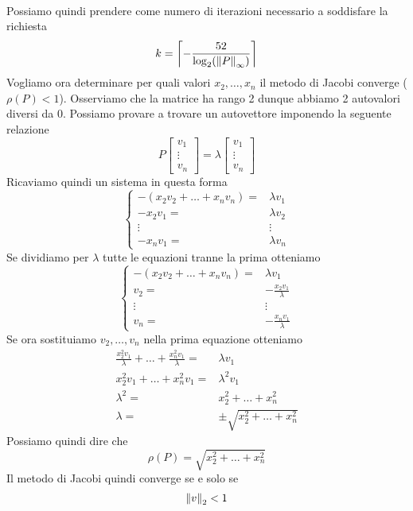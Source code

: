 \begin{example}
\begin{align*}
	\end{align*}
	Possiamo quindi prendere come numero di iterazioni necessario a soddisfare la richiesta
	\[ k = \left\lceil -\frac{52}{\log_2 (\left\lVert P\right\rVert_\infty)} \right\rceil \]
	Vogliamo ora determinare per quali valori $x_2, \dots, x_n$ il metodo di Jacobi converge ($\rho (P) < 1$).
	Osserviamo che la matrice ha rango 2 dunque abbiamo 2 autovalori diversi da 0. Possiamo provare a trovare un
	autovettore imponendo la seguente relazione
	\[
		P \begin{bmatrix} v_1 \\ \vdots \\ v_n \end{bmatrix} =
		\lambda \begin{bmatrix} v_1 \\ \vdots \\ v_n \end{bmatrix}
	\]
	Ricaviamo quindi un sistema in questa forma
	\[
		\begin{cases}
			- (x_2 v_2 + \dots + x_n v_n) = & \lambda v_1 \\
			-x_2 v_1 =                      & \lambda v_2 \\
			\vdots                          & \vdots      \\
			-x_n v_1 =                      & \lambda v_n
		\end{cases}
	\]
	Se dividiamo per $\lambda$ tutte le equazioni tranne la prima otteniamo
	\[
		\begin{cases}
			- (x_2 v_2 + \dots + x_n v_n) = & \lambda v_1              \\
			v_2 =                           & -\frac{x_2 v_1}{\lambda} \\
			\vdots                          & \vdots                   \\
			v_n =                           & -\frac{x_n v_1}{\lambda}
		\end{cases}
	\]
	Se ora sostituiamo $v_2, \dots, v_n$ nella prima equazione otteniamo
	\begin{align*}
		\frac{x_2^2 v_1}{\lambda} + \dots + \frac{x_n^2 v_1}{\lambda} = & \lambda v_1                      \\
		x_2^2 v_1 + \dots + x_n^2 v_1 =                                 & \lambda^2 v_1                    \\
		\lambda^2 =                                                     & x_2^2 + \dots + x_n^2            \\
		\lambda =                                                       & \pm \sqrt{x_2^2 + \dots + x_n^2}
	\end{align*}
	Possiamo quindi dire che
	\[ \rho(P) = \sqrt{x_2^2 + \dots + x_n^2} \]
	Il metodo di Jacobi quindi converge se e solo se
	\[ \left\lVert v\right\rVert_2 < 1 \]
\end{example}